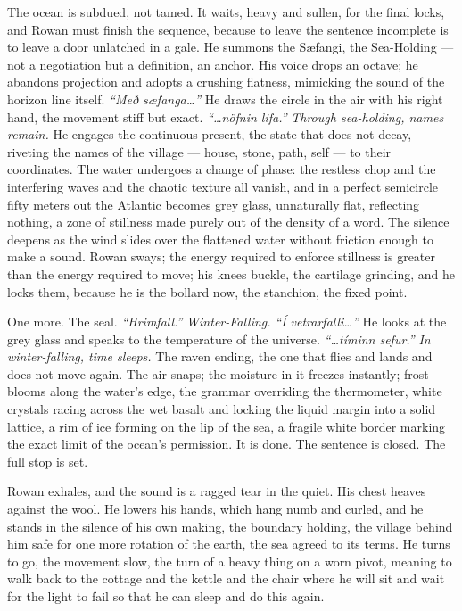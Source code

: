 \documentclass[11pt,oneside]{book}
\begin{document}
The ocean is subdued, not tamed. It waits, heavy and sullen, for the
final locks, and Rowan must finish the sequence, because to leave the
sentence incomplete is to leave a door unlatched in a gale. He summons
the Sæfangi, the Sea-Holding --- not a negotiation but a definition, an
anchor. His voice drops an octave; he abandons projection and adopts a
crushing flatness, mimicking the sound of the horizon line itself.
\emph{``Með sæfanga\ldots{}''} He draws the circle in the air with his
right hand, the movement stiff but exact. \emph{``\ldots nöfnin lifa.''}
\emph{Through sea-holding, names remain.} He engages the continuous
present, the state that does not decay, riveting the names of the
village --- house, stone, path, self --- to their coordinates. The water
undergoes a change of phase: the restless chop and the interfering waves
and the chaotic texture all vanish, and in a perfect semicircle fifty
meters out the Atlantic becomes grey glass, unnaturally flat, reflecting
nothing, a zone of stillness made purely out of the density of a word.
The silence deepens as the wind slides over the flattened water without
friction enough to make a sound. Rowan sways; the energy required to
enforce stillness is greater than the energy required to move; his knees
buckle, the cartilage grinding, and he locks them, because he is the
bollard now, the stanchion, the fixed point.

One more. The seal. \emph{``Hrimfall.''} \emph{Winter-Falling.}
\emph{``Í vetrarfalli\ldots{}''} He looks at the grey glass and speaks
to the temperature of the universe. \emph{``\ldots tíminn sefur.''}
\emph{In winter-falling, time sleeps.} The raven ending, the one that
flies and lands and does not move again. The air snaps; the moisture in
it freezes instantly; frost blooms along the water's edge, the grammar
overriding the thermometer, white crystals racing across the wet basalt
and locking the liquid margin into a solid lattice, a rim of ice forming
on the lip of the sea, a fragile white border marking the exact limit of
the ocean's permission. It is done. The sentence is closed. The full
stop is set.

Rowan exhales, and the sound is a ragged tear in the quiet. His chest
heaves against the wool. He lowers his hands, which hang numb and
curled, and he stands in the silence of his own making, the boundary
holding, the village behind him safe for one more rotation of the earth,
the sea agreed to its terms. He turns to go, the movement slow, the turn
of a heavy thing on a worn pivot, meaning to walk back to the cottage
and the kettle and the chair where he will sit and wait for the light to
fail so that he can sleep and do this again.
\end{document}

